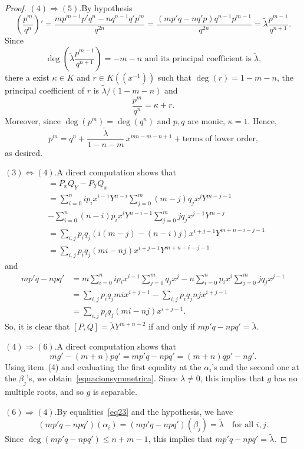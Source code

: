 \documentclass[reqno,a4paper]{amsart}
\theoremstyle{definition}
\theoremstyle{remark}
\newcommand{\wt}{\widetilde}
\begin{document}
\begin{proof}
\smallskip

\noindent $(4)\Rightarrow (5)$.\enspace By hypothesis
$$
\left(\frac{p^m}{q^n}\right)'=\frac{mp^{m-1}p'q^n-nq^{n-1}q'p^m}{q^{2n}}=
\frac{(mp'q-nq'p)q^{n-1}p^{m-1}}{q^{2n}}=\wt{\lambda}\frac{p^{m-1}}{q^{n+1}}.
$$
Since
$$
\deg\left(\wt{\lambda}\frac{p^{m-1}}{q^{n+1}}\right)=-m-n
\text{ and its principal coefficient is $\wt{\lambda}$,}
$$
there a exist $\kappa\in K$ and $r\in K((x^{-1}))$ such that $\deg(r) = 1-m-n$,
the principal coefficient of $r$ is $\wt{\lambda}/(1-m-n)$ and
$$
\frac{p^m}{q^n}=\kappa + r.
$$
Moreover, since $\deg(p^m) = \deg(q^n)$ and $p,q$ are monic, $\kappa = 1$. Hence,
$$
p^m=q^n+\frac{\wt{\lambda}}{1-n-m}\,x^{mn-m-n+1}+\text{terms of lower order,}
$$
as desired.

\smallskip

\noindent $(3)\Leftrightarrow (4)$.\enspace A direct computation shows that
\begin{align*}
[P,Q] & = P_x Q_Y-P_Y Q_x\\
%
& = \sum_{i=0}^n i p_i x^{i-1} Y^{n-i}\sum_{j=0}^m (m-j) q_j x^j Y^{m-j-1}\\
%
& - \sum_{i=0}^n (n-i) p_i x^i Y^{n-i-1}\sum_{j=0}^m j q_j x^{j-1} Y^{m-j}\\
%
& = \sum_{i,j} p_i q_j (i(m-j)-(n-i)j) x^{i+j-1} Y^{m+n-i-j-1}\\
%
&= \sum_{i,j} p_i q_j (mi-nj) x^{i+j-1} Y^{m+n-i-j-1}
\end{align*}
and
\begin{align*}
mp'q-npq' & = m \sum_{i=0}^n i p_i x^{i-1} \sum_{j=0}^m q_j x^j - n
\sum_{i=0}^n p_i x^i \sum_{j=0}^m j q_j x^{j-1}\\
%
& = \sum_{i,j} p_i q_j mi x^{i+j-1} - \sum_{i,j} p_i q_j nj x^{i+j-1}\\
%
&= \sum_{i,j} p_i q_j (mi-nj) x^{i+j-1}.
\end{align*}
So, it is clear that $[P,Q] = \wt{\lambda} Y^{m+n-2}$ if and only if $mp'q-npq'=\wt{\lambda}$.

\smallskip

\noindent $(4)\Rightarrow (6)$.\enspace A direct computation shows that
\begin{equation}
mg'-(m+n)pq'=mp'q-npq'=(m+n)qp'-ng'.\label{eq23}
\end{equation}
%
Using item~(4) and evaluating the first equality at the $\alpha_i$'s and the second
one at the $\beta_j$'s, we obtain~\eqref{equacionsymmetrica}. Since $\lambda\ne 0$,
this implies that $g$ has no multiple roots, and so $g$ is separable.

\smallskip

\noindent $(6)\Rightarrow (4)$.\enspace By equalities~\eqref{eq23} and the hypothesis, we have
$$
(mp'q-npq')(\alpha_i) = (mp'q-npq')(\beta_j) = \wt{\lambda}\quad\text{for all $i,j$.}
$$
Since $\deg(mp'q-npq') \le n+m-1$, this implies that $mp'q-npq' = \wt{\lambda}$.
\end{proof}
\end{document}
